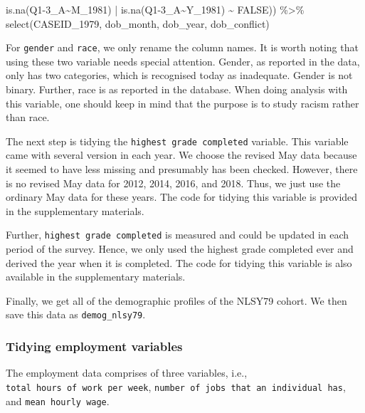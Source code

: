 \documentclass{article}
\newenvironment{Shaded}{\begin{snugshade}}{\end{snugshade}}
\newcommand{\AttributeTok}[1]{\textcolor[rgb]{0.77,0.63,0.00}{#1}}
\newcommand{\ConstantTok}[1]{\textcolor[rgb]{0.00,0.00,0.00}{#1}}
\newcommand{\FunctionTok}[1]{\textcolor[rgb]{0.00,0.00,0.00}{#1}}
\newcommand{\NormalTok}[1]{#1}
\newcommand{\SpecialCharTok}[1]{\textcolor[rgb]{0.00,0.00,0.00}{#1}}
\newcommand{\StringTok}[1]{\textcolor[rgb]{0.31,0.60,0.02}{#1}}
\begin{document}
\begin{Shaded}
\begin{Highlighting}[]
                      \FunctionTok{is.na}\NormalTok{(}\StringTok{\textasciigrave{}}\AttributeTok{Q1{-}3\_A\textasciitilde{}M\_1981}\StringTok{\textasciigrave{}}\NormalTok{) }\SpecialCharTok{|} \FunctionTok{is.na}\NormalTok{(}\StringTok{\textasciigrave{}}\AttributeTok{Q1{-}3\_A\textasciitilde{}Y\_1981}\StringTok{\textasciigrave{}}\NormalTok{) }\SpecialCharTok{\textasciitilde{}} \ConstantTok{FALSE}\NormalTok{)) }\SpecialCharTok{\%\textgreater{}\%}
  \FunctionTok{select}\NormalTok{(CASEID\_1979,}
\NormalTok{         dob\_month,}
\NormalTok{         dob\_year,}
\NormalTok{         dob\_conflict)}
\end{Highlighting}
\end{Shaded}

For \texttt{gender} and \texttt{race}, we only rename the column names. It is worth noting that using these two variable needs special attention. Gender, as reported in the data, only has two categories, which is recognised today as inadequate. Gender is not binary. Further, race is as reported in the database. When doing analysis with this variable, one should keep in mind that the purpose is to study racism rather than race.

The next step is tidying the \texttt{highest\ grade\ completed} variable. This variable came with several version in each year. We choose the revised May data because it seemed to have less missing and presumably has been checked. However, there is no revised May data for 2012, 2014, 2016, and 2018. Thus, we just use the ordinary May data for these years. The code for tidying this variable is provided in the supplementary materials.

Further, \texttt{highest\ grade\ completed} is measured and could be updated in each period of the survey. Hence, we only used the highest grade completed ever and derived the year when it is completed. The code for tidying this variable is also available in the supplementary materials.

Finally, we get all of the demographic profiles of the NLSY79 cohort. We then save this data as \texttt{demog\_nlsy79}.

\hypertarget{tidying-employment-variables}{%
\subsubsection{Tidying employment variables}\label{tidying-employment-variables}}

The employment data comprises of three variables, i.e., \texttt{total\ hours\ of\ work\ per\ week}, \texttt{number\ of\ jobs\ that\ an\ individual\ has}, and \texttt{mean\ hourly\ wage}.
\end{document}
